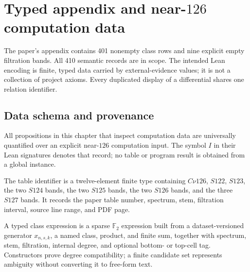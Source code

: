 \chapter{Typed appendix and near-$126$ computation data}
\label{chap:appendix-data}

The paper's appendix contains 401 nonempty class rows and nine explicit empty
filtration bands.  All 410 semantic records are in scope.  The intended Lean
encoding is finite, typed data carried by external-evidence values; it is not a
collection of project axioms.  Every duplicated display of a differential
shares one relation identifier.

\section{Data schema and provenance}

All propositions in this chapter that inspect computation data are universally
quantified over an explicit near-$126$ computation input.  The symbol $I$ in
their Lean signatures denotes that record; no table or program result is
obtained from a global instance.

\begin{definition}
  \label{def:appendix-table-id}
  \notready
  The table identifier is a twelve-element finite type containing
  $C\nu126$, $S122$, $S123$, the two $S124$ bands, the two $S125$ bands, the
  two $S126$ bands, and the three $S127$ bands.  It records the paper table
  number, spectrum, stem, filtration interval, source line range, and PDF page.
\end{definition}

\begin{definition}
  \label{def:typed-class-expression}
  \notready
  A typed class expression is a sparse $\mathbb F_2$ expression built from a
  dataset-versioned generator $x_{n,s,k}$, a named class, product, and finite
  sum, together with spectrum, stem, filtration, internal degree, and optional
  bottom- or top-cell tag.  Constructors prove degree compatibility; a finite
  candidate set represents ambiguity without converting it to free-form text.
\end{definition}

